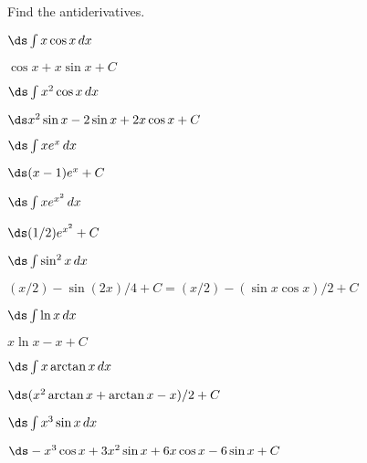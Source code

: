 \begin{enumialphparenastyle}

Find the antiderivatives.

\begin{ex}
 $\ds\int x\cos x\,dx$
\begin{sol}
 $\cos x+x\sin x+C$
\end{sol}
\end{ex}

\begin{ex}
 $\ds\int x^2\cos x\,dx$
\begin{sol}
 $\ds x^2\sin x-2 \sin x+2x\cos x +C$
\end{sol}
\end{ex}

\begin{ex}
 $\ds\int xe^x\,dx$
\begin{sol}
 $\ds (x-1)e^x +C$
\end{sol}
\end{ex}

\begin{ex}
 $\ds\int xe^{x^2}\,dx$
\begin{sol}
 $\ds (1/2)e^{x^2} +C$
\end{sol}
\end{ex}

\begin{ex}
 $\ds\int \sin^2 x\,dx$
\begin{sol}
 $(x/2)-\sin(2x)/4 +C=$\hfill\break$(x/2)-(\sin x\cos x)/2+C$
\end{sol}
\end{ex}

\begin{ex}
 $\ds\int \ln x\,dx$
\begin{sol}
 $x\ln x-x +C$
\end{sol}
\end{ex}

\begin{ex}
 $\ds\int x\arctan x\,dx$
\begin{sol}
 $\ds (x^2\arctan x +\arctan x -x)/2+C$
\end{sol}
\end{ex}

\begin{ex}
 $\ds\int x^3\sin x\,dx$
\begin{sol}
 $\ds -x^3\cos x+3x^2\sin x+6x\cos x-6\sin x+C$
\end{sol}
\end{ex}


\end{enumialphparenastyle}
